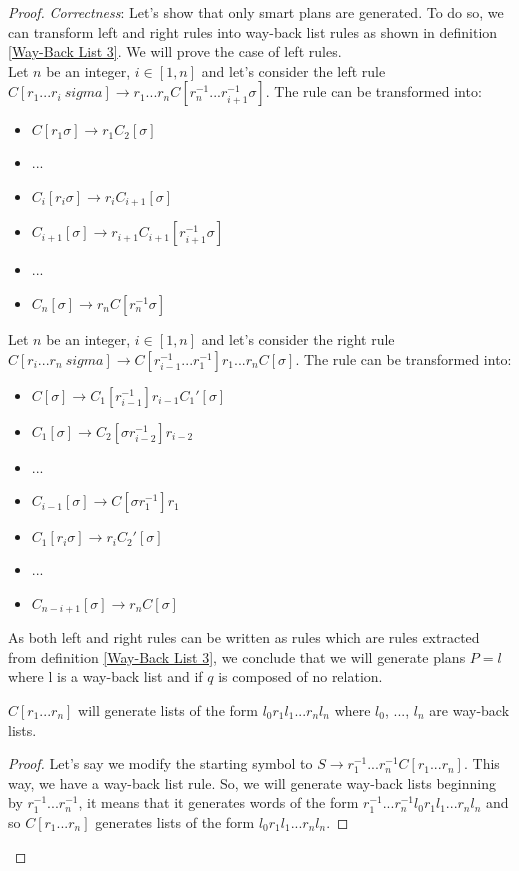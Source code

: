 \documentclass[10pt,a4paper,draft]{article}
\begin{document}
\begin{proof}
\textit{Correctness}: Let's show that only smart plans are generated. To do so, we can transform left and right rules into way-back list rules as shown in definition \ref{Way-Back List 3}. We will prove the case of left rules.\\
Let $n$ be an integer, $i \in [1, n]$ and let's consider the left rule $C[r_1...r_i \ sigma] \rightarrow r_1 ... r_n C[r_n^{-1} ... r_{i+1}^{-1} \sigma]$. The rule can be transformed into:
\begin{itemize}
\item $C[r_1 \sigma] \rightarrow r_1 C_2[\sigma]$
\item ...
\item $C_i[r_i \sigma] \rightarrow r_i C_{i+1}[\sigma]$
\item $C_{i+1}[\sigma] \rightarrow r_{i+1} C_{i+1}[r_{i+1}^{-1} \sigma]$
\item ...
\item $C_n[\sigma] \rightarrow r_n C[r_n^{-1} \sigma]$
\end{itemize}
Let $n$ be an integer, $i \in [1, n]$ and let's consider the right rule $C[r_i...r_n \ sigma] \rightarrow C[r_{i-1}^{-1} ... r_{1}^{-1}] r_1 ... r_n C[\sigma]$. The rule can be transformed into:
\begin{itemize}
\item $C[\sigma] \rightarrow C_1[r_{i-1}^{-1}] r_{i-1} C_1'[\sigma]$
\item $C_1[\sigma] \rightarrow C_2[\sigma r_{i-2}^{-1}] r_{i-2}$
\item ...
\item $C_{i-1}[\sigma] \rightarrow C[\sigma r_1^{-1}] r_1$
\item $C_1[r_i \sigma] \rightarrow r_i C_2'[\sigma]$
\item ...
\item $C_{n - i + 1}[\sigma] \rightarrow r_n C[\sigma]$
\end{itemize}
As both left and right rules can be written as rules which are rules extracted from definition \ref{Way-Back List 3}, we conclude that we will generate plans $P = l$ where l is a way-back list and if $q$ is composed of no relation.

\begin{lemma}
\label{formWordsGrammar}
$C[r_1 ... r_n]$ will generate lists of the form $l_0 r_1 l_1 ... r_n l_n$ where $l_0$, ..., $l_n$ are way-back lists.
\end{lemma}

\begin{proof}
Let's say we modify the starting symbol to $S \rightarrow r_1^{-1} ... r_n^{-1} C[r_1 ... r_n]$. This way, we have a way-back list rule. So, we will generate way-back lists beginning by $r_1^{-1} ... r_n^{-1}$, it means that it generates words of the form $r_1^{-1} ... r_n^{-1} l_0 r_1 l_1 ... r_n l_n$ and so $C[r_1 ... r_n]$ generates lists of the form $l_0 r_1 l_1 ... r_n l_n$.
\end{proof}


\end{proof}
\end{document}
